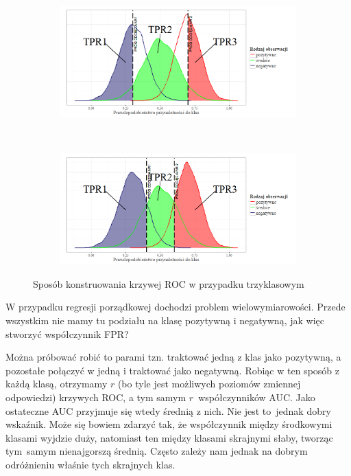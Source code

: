 \documentclass{mini}
\begin{document}
\begin{figure}[h]
	\begin{center}
  \begin{subfigure}[h]{\textwidth}
    \includegraphics[width=\textwidth]{graphics/roc_trzy1.png}
  \end{subfigure}\\
  \begin{subfigure}[h]{\textwidth}
    \includegraphics[width=\textwidth]{graphics/roc_trzy2.png}
  \end{subfigure}
  \end{center}
  \caption{Sposób konstruowania krzywej ROC w przypadku trzyklasowym}
  \label{trzyklasowy}
\end{figure}

W przypadku regresji porządkowej dochodzi problem wielowymiarowości. Przede wszystkim nie mamy tu podziału na klasę pozytywną i negatywną, jak więc stworzyć współczynnik FPR? 

Można próbować robić to parami tzn. traktować jedną z klas jako pozytywną, a pozostałe połączyć w jedną i traktować jako negatywną. Robiąc w ten sposób z każdą klasą, otrzymamy $r$ (bo tyle jest możliwych poziomów zmiennej odpowiedzi) krzywych ROC, a tym samym $r$~współczynników AUC. Jako ostateczne AUC przyjmuje się wtedy średnią z nich. Nie jest to~jednak dobry wskaźnik. Może się bowiem zdarzyć tak, że współczynnik między środkowymi klasami wyjdzie duży, natomiast ten między klasami skrajnymi słaby, tworząc tym~samym nienajgorszą średnią. Często zależy nam jednak na dobrym odróżnieniu właśnie tych skrajnych klas. 
\end{document}
